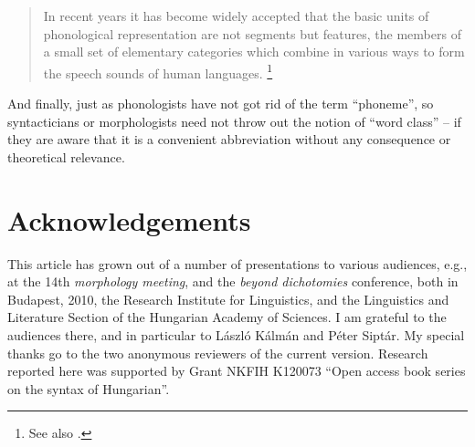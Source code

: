 \documentclass[output=paper]{langsci/langscibook}
\begin{document}
\begin{quote}

In recent years it has become widely accepted that the basic units of
phonological representation are not segments but features, the members of a
small set of elementary categories which combine in
various ways to form the speech sounds of human languages.
\parencite[245]{ClementsHume1995}\footnote{See also \citet{Siptár2006}.}

\end{quote}

And finally, just as phonologists have not got rid of the term
\enquote{phoneme}, so syntacticians or morphologists need not throw out the
notion of \enquote{word class} -- if they are aware that it is a convenient
abbreviation without any consequence or theoretical relevance.

\printchapterglossary{}

\section*{Acknowledgements}

This article has grown out of a number of presentations to various audiences,
e.g., at the 14th \emph{morphology meeting}, and the \emph{beyond dichotomies} conference,
both in Budapest, 2010, the Research Institute for Linguistics, and the
Linguistics and Literature Section of the Hungarian Academy of Sciences. I am
grateful to the audiences there, and in particular to László Kálmán and Péter
Siptár. My special thanks go to the two anonymous reviewers of the current
version.  Research reported here was supported by Grant NKFIH K120073
\enquote{Open access book series on the syntax of Hungarian}.

{\sloppy
\printbibliography[heading=subbibliography,notkeyword=this]
}
\end{document}
